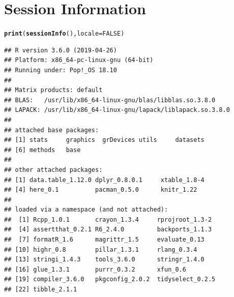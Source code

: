 \documentclass[11pt,letter]{article}\usepackage[]{graphicx}\usepackage[]{color}
\makeatletter
\newcommand{\hlnum}[1]{\textcolor[rgb]{0.686,0.059,0.569}{#1}}%
\newcommand{\hlstd}[1]{\textcolor[rgb]{0.345,0.345,0.345}{#1}}%
\newcommand{\hlkwc}[1]{\textcolor[rgb]{0.333,0.667,0.333}{#1}}%
\newcommand{\hlkwd}[1]{\textcolor[rgb]{0.737,0.353,0.396}{\textbf{#1}}}%
\newenvironment{kframe}{%
 \def\at@end@of@kframe{}%
 \ifinner\ifhmode%
  \def\at@end@of@kframe{\end{minipage}}%
  \begin{minipage}{\columnwidth}%
 \fi\fi%
 \def\FrameCommand##1{\hskip\@totalleftmargin \hskip-\fboxsep
 \colorbox{shadecolor}{##1}\hskip-\fboxsep
     \hskip-\linewidth \hskip-\@totalleftmargin \hskip\columnwidth}%
 \MakeFramed {\advance\hsize-\width
   \@totalleftmargin\z@ \linewidth\hsize
   \@setminipage}}%
 {\par\unskip\endMakeFramed%
 \at@end@of@kframe}
\newenvironment{knitrout}{}{} %
\makeatother
\begin{document}
\newpage

\section{Session Information}
\begin{knitrout}
\color{fgcolor}\begin{kframe}
\begin{alltt}
\hlkwd{print}\hlstd{(}\hlkwd{sessionInfo}\hlstd{(),} \hlkwc{locale} \hlstd{=} \hlnum{FALSE}\hlstd{)}
\end{alltt}
\begin{verbatim}
## R version 3.6.0 (2019-04-26)
## Platform: x86_64-pc-linux-gnu (64-bit)
## Running under: Pop!_OS 18.10
## 
## Matrix products: default
## BLAS:   /usr/lib/x86_64-linux-gnu/blas/libblas.so.3.8.0
## LAPACK: /usr/lib/x86_64-linux-gnu/lapack/liblapack.so.3.8.0
## 
## attached base packages:
## [1] stats     graphics  grDevices utils     datasets 
## [6] methods   base     
## 
## other attached packages:
## [1] data.table_1.12.0 dplyr_0.8.0.1     xtable_1.8-4     
## [4] here_0.1          pacman_0.5.0      knitr_1.22       
## 
## loaded via a namespace (and not attached):
##  [1] Rcpp_1.0.1       crayon_1.3.4     rprojroot_1.3-2 
##  [4] assertthat_0.2.1 R6_2.4.0         backports_1.1.3 
##  [7] formatR_1.6      magrittr_1.5     evaluate_0.13   
## [10] highr_0.8        pillar_1.3.1     rlang_0.3.4     
## [13] stringi_1.4.3    tools_3.6.0      stringr_1.4.0   
## [16] glue_1.3.1       purrr_0.3.2      xfun_0.6        
## [19] compiler_3.6.0   pkgconfig_2.0.2  tidyselect_0.2.5
## [22] tibble_2.1.1
\end{verbatim}
\end{kframe}
\end{knitrout}
\end{document}
